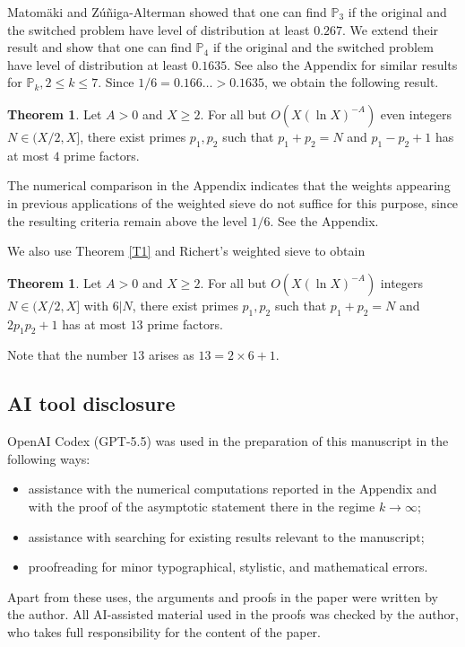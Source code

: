 \documentclass{amsart}
\theoremstyle{definition}
\newtheorem{thm}[dfn]{Theorem}
\theoremstyle{remark}
\newcommand{\1}{
    \bm{1}
}
\begin{document}
Matom{\"a}ki and Z{\'u}{\~n}iga-Alterman \cite{matomaki2025weighted} showed that one can find $\mathbb{P}_3$ if the original and the switched problem have level of distribution at least $0.267$. 
We extend their result and show that one can find $\mathbb{P}_4$ if the original and the switched problem have level of distribution at least $0.1635$. See also the Appendix for similar results for $\mathbb{P}_k, 2 \leq k \leq 7$. 
Since $1/6=0.166\ldots>0.1635$, we obtain the following result. 
\begin{thm}\label{T2}
Let $A>0$ and $X \geq 2$. 
For all but $O(X(\ln{X})^{-A})$ even integers $N \in (X/2,X]$, there exist primes $p_1,p_2$ such that $p_1+p_2=N$ and $p_1-p_2+1$ has at most $4$ prime factors. 
\end{thm}
The numerical comparison in the Appendix indicates that the weights appearing in previous applications of the weighted sieve do not suffice for this purpose, since the resulting criteria remain above the level $1/6$. See the Appendix.

We also use Theorem \ref{T1} and Richert's weighted sieve to obtain
\begin{thm}\label{T3}
Let $A>0$ and $X \geq 2$. 
For all but $O(X(\ln{X})^{-A})$ integers $N \in (X/2,X]$ with $6|N$, there exist primes $p_1,p_2$ such that $p_1+p_2=N$ and $2p_1p_2+1$ has at most $13$ prime factors. 
\end{thm}
Note that the number $13$ arises as $13=2 \times 6 + 1$.






\subsection{AI tool disclosure}


OpenAI Codex (GPT-5.5) was used in the preparation of this manuscript in the following ways:
\begin{itemize}
\item assistance with the numerical computations reported in the Appendix and with the proof of the asymptotic statement there in the regime \(k\to\infty\);
\item assistance with searching for existing results relevant to the manuscript;
\item proofreading for minor typographical, stylistic, and mathematical errors.
\end{itemize}
Apart from these uses, the arguments and proofs in the paper were written by the author.  All AI-assisted material used in the proofs was checked by the author, who takes full responsibility for the content of the paper.
\end{document}
